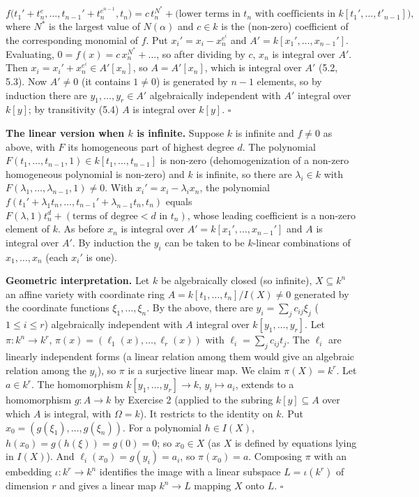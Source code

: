 \documentclass[11pt]{article}
\begin{document}
\[
f\bigl(t_1'+t_n^{e},\dots,t_{n-1}'+t_n^{e^{n-1}},t_n\bigr)=c\,t_n^{N^*}+\text{(lower terms in }t_n\text{ with coefficients in }k[t_1',\dots,t'_{n-1}]),
\]
where $N^*$ is the largest value of $N(\alpha)$ and $c\in k$ is the (non-zero) coefficient of the corresponding monomial of $f$. Put $x_i'=x_i-x_n^{e^i}$ and $A'=k[x_1',\dots,x_{n-1}']$. Evaluating, $0=f(x)=c\,x_n^{N^*}+\dots$, so after dividing by $c$, $x_n$ is integral over $A'$. Then $x_i=x_i'+x_n^{e^i}\in A'[x_n]$, so $A=A'[x_n]$, which is integral over $A'$ (5.2, 5.3). Now $A'\ne0$ (it contains $1\ne0$) is generated by $n-1$ elements, so by induction there are $y_1,\dots,y_r\in A'$ algebraically independent with $A'$ integral over $k[y]$; by transitivity (5.4) $A$ is integral over $k[y]$. \hfill$\square$

\textbf{The linear version when $k$ is infinite.} Suppose $k$ is infinite and $f\ne0$ as above, with $F$ its homogeneous part of highest degree $d$. The polynomial $F(t_1,\dots,t_{n-1},1)\in k[t_1,\dots,t_{n-1}]$ is non-zero (dehomogenization of a non-zero homogeneous polynomial is non-zero) and $k$ is infinite, so there are $\lambda_i\in k$ with $F(\lambda_1,\dots,\lambda_{n-1},1)\ne0$. With $x_i'=x_i-\lambda_ix_n$, the polynomial $f(t_1'+\lambda_1t_n,\dots,t_{n-1}'+\lambda_{n-1}t_n,t_n)$ equals $F(\lambda,1)t_n^d+(\text{terms of degree}<d\text{ in }t_n)$, whose leading coefficient is a non-zero element of $k$. As before $x_n$ is integral over $A'=k[x_1',\dots,x_{n-1}']$ and $A$ is integral over $A'$. By induction the $y_i$ can be taken to be $k$-linear combinations of $x_1,\dots,x_n$ (each $x_i'$ is one).

\textbf{Geometric interpretation.} Let $k$ be algebraically closed (so infinite), $X\subseteq k^n$ an affine variety with coordinate ring $A=k[t_1,\dots,t_n]/I(X)\ne0$ generated by the coordinate functions $\xi_1,\dots,\xi_n$. By the above, there are $y_i=\sum_jc_{ij}\xi_j$ ($1\le i\le r$) algebraically independent with $A$ integral over $k[y_1,\dots,y_r]$. Let $\pi:k^n\to k^r$, $\pi(x)=(\ell_1(x),\dots,\ell_r(x))$ with $\ell_i=\sum_jc_{ij}t_j$. The $\ell_i$ are linearly independent forms (a linear relation among them would give an algebraic relation among the $y_i$), so $\pi$ is a surjective linear map. We claim $\pi(X)=k^r$. Let $a\in k^r$. The homomorphism $k[y_1,\dots,y_r]\to k$, $y_i\mapsto a_i$, extends to a homomorphism $g:A\to k$ by Exercise 2 (applied to the subring $k[y]\subseteq A$ over which $A$ is integral, with $\Omega=k$). It restricts to the identity on $k$. Put $x_0=(g(\xi_1),\dots,g(\xi_n))$. For a polynomial $h\in I(X)$, $h(x_0)=g(h(\xi))=g(0)=0$; so $x_0\in X$ (as $X$ is defined by equations lying in $I(X)$). And $\ell_i(x_0)=g(y_i)=a_i$, so $\pi(x_0)=a$. Composing $\pi$ with an embedding $\iota:k^r\to k^n$ identifies the image with a linear subspace $L=\iota(k^r)$ of dimension $r$ and gives a linear map $k^n\to L$ mapping $X$ onto $L$. \hfill$\square$
\end{document}
